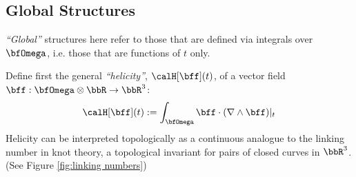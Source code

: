 \subsection*{Global Structures}
    \emph{``Global''} structures here refer to those that are defined via integrals over $\bfOmega$, i.e. those that are functions of $t$ only.

    Define first the general \emph{``helicity''}, $\calH[\bff](t)$, of a vector field $\bff : \bfOmega\otimes\bbR \rightarrow \bbR^{3}$: \cite{Moffatt_1969, Brown_Canfield_Pevtsov_1999}
    \begin{equation}
        \calH[\bff](t)  :=  \int_{\bfOmega}\bff\cdot(\nabla\wedge\bff)|_{t}
    \end{equation}
    Helicity can be interpreted topologically as a continuous analogue to the linking number in knot theory, a topological invariant for pairs of closed curves in $\bbR^{3}$. \cite{Berger_1999} (See Figure \ref{fig:linking numbers})

